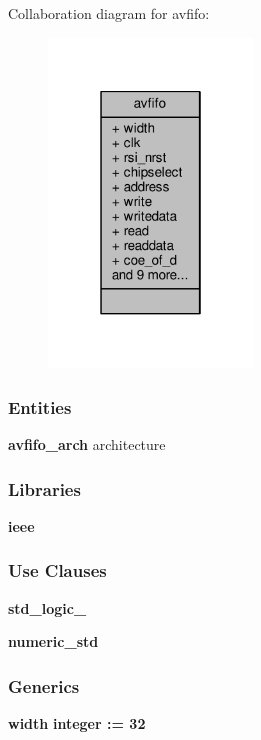 Collaboration diagram for avfifo\+:\nopagebreak
\begin{figure}[H]
\begin{center}
\leavevmode
\includegraphics[width=154pt]{d3/d55/classavfifo__coll__graph}
\end{center}
\end{figure}
\subsubsection*{Entities}
\begin{DoxyCompactItemize}
\item 
{\bf avfifo\+\_\+arch} architecture
\end{DoxyCompactItemize}
\subsubsection*{Libraries}
 \begin{DoxyCompactItemize}
\item 
{\bf ieee} 
\end{DoxyCompactItemize}
\subsubsection*{Use Clauses}
 \begin{DoxyCompactItemize}
\item 
{\bf std\+\_\+logic\+\_}   
\item 
{\bf numeric\+\_\+std}   
\end{DoxyCompactItemize}
\subsubsection*{Generics}
 \begin{DoxyCompactItemize}
\item 
{\bf width} {\bfseries {\bfseries \textcolor{comment}{integer}\textcolor{vhdlchar}{ }\textcolor{vhdlchar}{ }\textcolor{vhdlchar}{\+:}\textcolor{vhdlchar}{=}\textcolor{vhdlchar}{ }\textcolor{vhdlchar}{ } \textcolor{vhdldigit}{32} \textcolor{vhdlchar}{ }}}
\end{DoxyCompactItemize}
